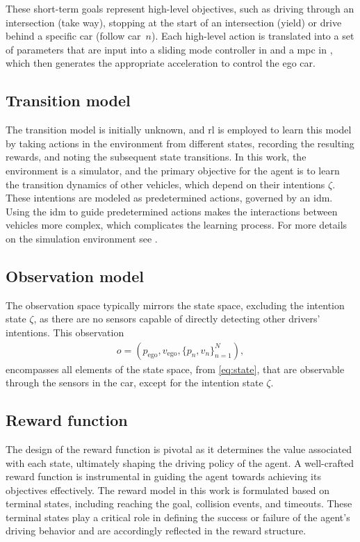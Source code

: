 These short-term goals represent high-level objectives, such as driving through an intersection (take way), stopping at the start of an intersection (yield) or drive behind a specific car (follow car~$n$). Each high-level action is translated into a set of parameters that are input into a sliding mode controller in \paperLSTM and a \gls{mpc} in \paperMPC, which then generates the appropriate acceleration to control the ego car.

\subsection{Transition model}
The transition model is initially unknown, and \gls{rl} is employed to learn this model by taking actions in the environment from different states, recording the resulting rewards, and noting the subsequent state transitions. In this work, the environment is a simulator, and the primary objective for the agent is to learn the transition dynamics of other vehicles, which depend on their intentions $\zeta$. These intentions are modeled as predetermined actions, governed by an \gls{idm}. Using the \gls{idm} to guide predetermined actions makes the interactions between vehicles more complex, which complicates the learning process. For more details on the simulation environment see \paperLSTM.


\subsection{Observation model}
The observation space typically mirrors the state space, excluding the intention state $\zeta$, as there are no sensors capable of directly detecting other drivers' intentions. This observation 
\begin{align}
	o = (p_\mathrm{ego}, v_\mathrm{ego}, \{p_{n}, v_n\}_{n=1}^N), 
	\label{eq:observation}
\end{align}
encompasses all elements of the state space, from \eqref{eq:state}, that are observable through the sensors in the car, except for the intention state $\zeta$.

\subsection{Reward function}
The design of the reward function is pivotal as it determines the value associated with each state, ultimately shaping the driving policy of the agent. A well-crafted reward function is instrumental in guiding the agent towards achieving its objectives effectively.
The reward model in this work is formulated based on terminal states, including reaching the goal, collision events, and timeouts. These terminal states play a critical role in defining the success or failure of the agent's driving behavior and are accordingly reflected in the reward structure.

